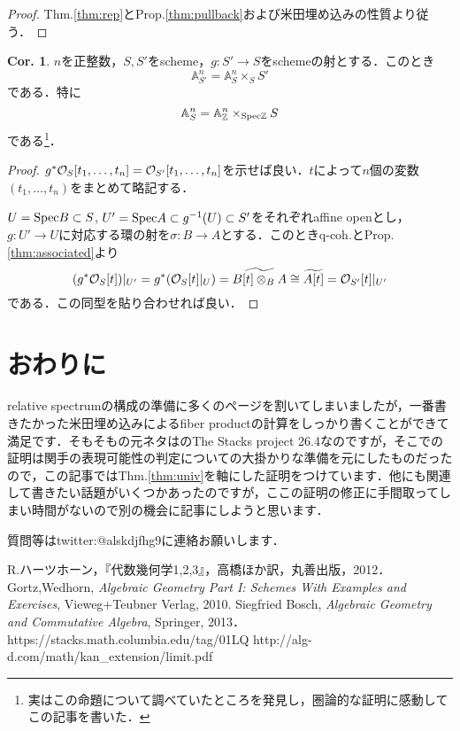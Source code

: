 \documentclass[dvipdfmx,b5paper,papersize]{jsarticle}
\theoremstyle{definition}
\newtheorem{cor}[thm]{Cor.}
\begin{document}
\begin{proof}
  Thm.\ref{thm:rep}とProp.\ref{thm:pullback}および米田埋め込みの性質より従う．
\end{proof}
\begin{cor}
  $n$を正整数，$S,S'$をscheme，$g:S' \to S$をschemeの射とする．このとき
  \[
    \mathbb{A}^n_{S'}=\mathbb{A}^n_S \times_S S'
  \]
  である．特に
  \[
    \mathbb{A}^n_S=\mathbb{A}^n_{\mathbb{Z}} \times_{{\rm Spec}{\mathbb{Z}}} S
  \]
  である\footnote{実はこの命題について調べていたところ\cite{stacks_project}を発見し，圏論的な証明に感動してこの記事を書いた．}．

\end{cor}
\begin{proof}
  $g^*{{\cal{O}}_S[t_1,\dots ,t_n]}={{\cal{O}}_{S'}[t_1,\dots ,t_n]}$を示せば良い．$t$によって$n$個の変数$(t_1,\dots,t_n)$をまとめて略記する．

  $U={\rm Spec}B \subset S$,
  $U'={\rm Spec}A \subset g^{-1}(U) \subset S'$をそれぞれaffine openとし，$g:U' \to U$に対応する環の射を$\sigma:B \to A$とする．このときq-coh.とProp.\ref{thm:associated}より
  \[
  (g^*{\cal{O}}_S[t])|_{U'}=g^*({\cal{O}}_S[t]|_U)={\widetilde {B[t] \otimes_B A}}\cong {\widetilde{A[t]}}={\cal{O}}_{S'}[t]|_{U'}
  \]
  である．この同型を貼り合わせれば良い．
\end{proof}

\section{おわりに}
relative spectrumの構成の準備に多くのページを割いてしまいましたが，一番書きたかった米田埋め込みによるfiber productの計算をしっかり書くことができて満足です．そもそもの元ネタは\cite{stacks_project}のThe Stacks project 26.4なのですが，そこでの証明は関手の表現可能性の判定についての大掛かりな準備を元にしたものだったので，この記事ではThm.\ref{thm:univ}を軸にした証明をつけています．他にも関連して書きたい話題がいくつかあったのですが，ここの証明の修正に手間取ってしまい時間がないので別の機会に記事にしようと思います．

質問等はtwitter:@alskdjfhg9に連絡お願いします．
\begin{thebibliography}{2}
 R.ハーツホーン，『代数幾何学1,2,3』，高橋ほか訳，丸善出版，2012．
 Gortz,Wedhorn, {\sl Algebraic Geometry
Part I: Schemes With Examples and Exercises}, Vieweg+Teubner Verlag, 2010.
 Siegfried Bosch, {\sl Algebraic Geometry and Commutative Algebra}, Springer, 2013．
 {https://stacks.math.columbia.edu/tag/01LQ
}
  {http://alg-d.com/math/kan\_extension/limit.pdf}
\end{thebibliography}
\end{document}
